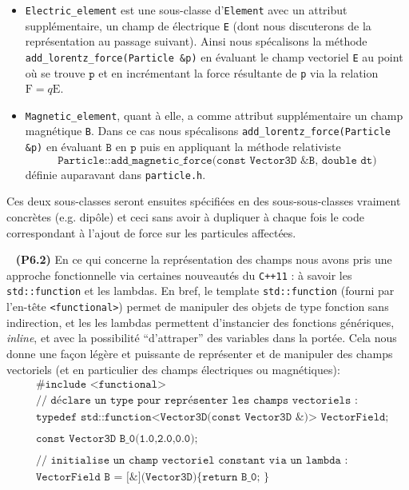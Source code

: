 \documentclass[12pt, letterpaper, twoside]{article}
\newcommand{\T}[1]{\texttt{#1}}
\begin{document}
\begin{itemize}
\item \T{Electric\_element} est une sous-classe d'\T{Element} avec un attribut supplémentaire, un champ de électrique \T{E} (dont nous discuterons de la représentation au passage suivant). Ainsi nous spécalisons la méthode \T{add\_lorentz\_force(Particle \&p)} en évaluant le champ vectoriel \T{E} au point où se trouve $\T{p}$ et en incrémentant la force résultante de \T{p} via la relation $\boldsymbol{\mathrm{F}}=q\boldsymbol{\mathrm{E}}$.

\item \T{Magnetic\_element}, quant à elle, a comme attribut supplémentaire un champ magnétique \T{B}. Dans ce cas nous spécalisons \T{add\_lorentz\_force(Particle \&p)} en évaluant $\T{B}$ en $\T{p}$ puis en appliquant la méthode relativiste $$\T{Particle::add\_magnetic\_force(const Vector3D \&B, double dt)}$$ définie auparavant dans \T{particle.h}.

\end{itemize}

\noindent Ces deux sous-classes seront ensuites spécifiées en des sous-sous-classes vraiment concrètes (e.g. dipôle) et ceci sans avoir à dupliquer à chaque fois le code correspondant à l'ajout de force sur les particules affectées.

\ \linebreak
\textbf{(P6.2)} En ce qui concerne la représentation des champs nous avons pris une approche fonctionnelle via certaines nouveautés du \T{C++11} : à savoir les \T{std::function} et les lambdas. En bref, le template \T{std::function} (fourni par l'en-tête \T{<functional>}) permet de manipuler des objets de type fonction sans indirection, et les les lambdas permettent d'instancier des fonctions génériques, \textit{inline}, et avec la possibilité ``d'attraper'' des variables dans la portée. Cela nous donne une façon légère et puissante de représenter et de manipuler des champs vectoriels (et en particulier des champs électriques ou magnétiques):
\begin{align*}
	&\T{\#include <functional>}\\
	&\T{// déclare un type pour représenter les champs vectoriels : }\\
	&\T{typedef std::function<Vector3D(const Vector3D \&)> VectorField;}\\ \\
	&\T{const Vector3D B\_0(1.0,2.0,0.0);}\\ \\
	&\T{// initialise un champ vectoriel constant via un lambda : }\\
	&\T{VectorField B = [\&](Vector3D)\{ return B\_0; \}}
\end{align*}
\end{document}
